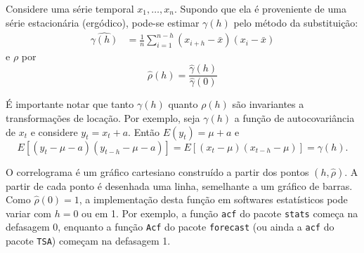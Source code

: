 \documentclass[
  letterpaper,
  DIV=11,
  numbers=noendperiod]{scrreprt}
\theoremstyle{plain}
\theoremstyle{definition}
\theoremstyle{definition}
\theoremstyle{remark}
\begin{document}
Considere uma série temporal \(x_1,\ldots,x_n\). Supondo que ela é
proveniente de uma série estacionária (ergódico), pode-se estimar
\(\gamma(h)\) pelo método da substituição: \[\begin{align}
                        \widehat{\gamma(h)}&=\frac{1}{n}\sum_{i=1}^{n-h}\left(x_{i+h} - \bar{x}\right)\left(x_{i} - \bar{x}\right)
                        \end{align}\] e \(\rho\) por\\
\[\begin{equation}
        \hat{\rho}(h)=\frac{\hat{\gamma}(h)}{\hat{\gamma}(0)}
        \end{equation}\]

É importante notar que tanto \(\gamma(h)\) quanto \(\rho(h)\) são
invariantes a transformações de locação. Por exemplo, seja \(\gamma(h)\)
a função de autocovariância de \(x_t\) e considere \(y_t=x_t+a\). Então
\(E(y_t)=\mu+a\) e
\[E[(y_t-\mu-a)(y_{t-h}-\mu-a)]=E[(x_t-\mu)(x_{t-h}-\mu)]=\gamma(h).\]

O correlograma é um gráfico cartesiano construído a partir dos pontos
\((h, \hat{\rho})\). A partir de cada ponto é desenhada uma linha,
semelhante a um gráfico de barras. Como \(\hat{\rho}(0)=1\), a
implementação desta função em softwares estatísticos pode variar com
\(h=0\) ou em 1. Por exemplo, a função \texttt{acf} do pacote
\texttt{stats} começa na defasagem 0, enquanto a função \texttt{Acf} do
pacote \texttt{forecast} (ou ainda a \texttt{acf} do pacote
\texttt{TSA}) começam na defasagem 1.
\end{document}

